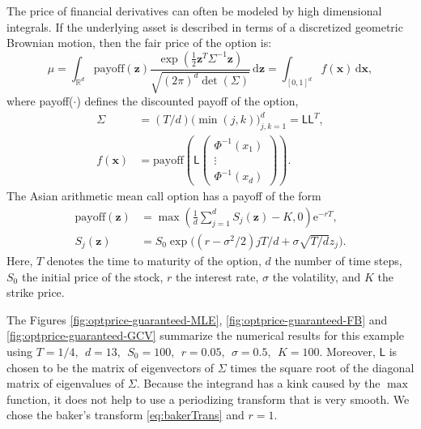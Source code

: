 \documentclass{iitthesis}          %
\newcommand{\bm}[1]{\boldsymbol{#1}}
\newcommand{\mSigma}{\mathsf{\Sigma}}
\newcommand{\dif}[1]{\text{d}{#1}}
\newcommand{\reals}{\mathbb{R}}
\newcommand{\vx}{\bm{x}}
\newcommand{\dvx}{\dif{\bm{x}}}
\newcommand{\vz}{\bm{z}}
\newcommand{\dvz}{\dif{\bm{z}}}
\newcommand{\mL}{\mathsf{L}}
\newcommand{\me}{\mathrm{e}}
\newcommand{\code}[1]{\texttt{#1}}
\begin{document}
{{{{{{

The price of financial derivatives can often be modeled by high dimensional integrals. If the underlying asset is described in terms of a discretized geometric Brownian motion, then the fair price of the option is:
\begin{equation*}
\mu = \int_{\reals^d} \text{payoff}(\vz) \frac{\exp(\frac 12 \vz^T\mSigma^{-1}\vz)}{\sqrt{(2\pi)^d \det(\mSigma)}} \, \dvz = \int_{[0,1]^d} f(\vx) \, \dvx,
\end{equation*} 
where {payoff($\cdot$)} defines the discounted payoff of the option,
\begin{align*}
\mSigma &= (T/d) \bigl(\min(j,k) \bigr)_{j,k=1}^d = \mL \mL^T,\\
f(\vx) &= \text{payoff} \left(\mL 
\begin{pmatrix}
\Phi^{-1}(x_1) \\ \vdots \\ \Phi^{-1}(x_d)
\end{pmatrix} \right).
\end{align*}
The Asian arithmetic mean call option has a payoff of the form
\begin{align*}
\text{payoff}(\vz) &= \max\left( \frac 1d  \sum_{j=1}^d S_j(\vz) - K, 0 \right) \me^{-r T}, \\
S_j(\vz) &= S_0 \exp\bigl((r-\sigma^2/2)jT/d + \sigma \sqrt{T/d} z_j \bigr).
\end{align*}
Here, $T$ denotes the time to maturity of the option, $d$ the number of time steps, $S_0$ the initial price of the stock, $r$ the interest rate, $\sigma$ the volatility, and $K$ the strike price.  

\Subsection{Using \code{cubBayesLattice\_g}}
The Figures \ref{fig:optprice-guaranteed-MLE}, \ref{fig:optprice-guaranteed-FB} and 
\ref{fig:optprice-guaranteed-GCV} summarize the numerical results for this example using
$
T = 1/4, \ \ d = 13, \ \ S_0 = 100, \ \ r =  0.05, \ \ \sigma = 0.5, \ \ K = 100.
$
Moreover, $\mL$ is chosen to be the matrix of eigenvectors of $\mSigma$ times the square root of the diagonal matrix of eigenvalues of $\mSigma$.
Because the integrand has a kink caused by the $\max$ function, it does not help to use a periodizing transform that is very smooth.  We chose the baker's transform \eqref{eq:bakerTrans} and $r = 1$.


}}}}}}
\end{document}
